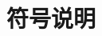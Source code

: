 \documentclass[12pt,a4paper]{article}
\newcommand{\prompt}[1]{\par\noindent\textbf{【写作提示】}#1\par}      %
\newcommand{\pitfall}[1]{\par\noindent\textbf{【容易失分】}#1\par}     %
\newcommand{\ph}[1]{\textbf{【#1】}}                                   %
\newcommand{\handbook}[2]{\par\noindent\textbf{【手册索引：#1】} #2\par}
\begin{document}



\section{符号说明}


\end{document}
